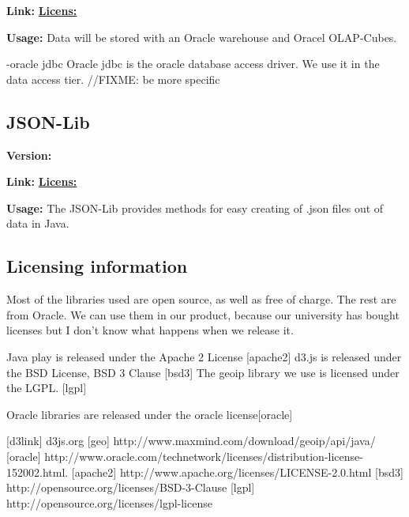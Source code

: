 \textbf{Link:} \href{}

\textbf{Licens:}

\textbf{Usage:} 
Data will be stored with an Oracle warehouse and Oracel OLAP-Cubes.

-oracle jdbc
Oracle jdbc is the oracle database access driver. We use it in the data access tier. //FIXME: be more specific

\subsection{JSON-Lib}
\textbf{Version:} 

\textbf{Link:} \href{}

\textbf{Licens:}

\textbf{Usage:} 
The JSON-Lib provides methods for easy creating of .json files out of data in Java.


\subsection{Licensing information}
Most of the libraries used are open source, as well as free of charge.
The rest are from Oracle. We can use them in our product, because our university has bought licenses 
but I don't know what happens when we release it. 

Java play is released under the Apache 2 License [apache2]
d3.js is released under the BSD License, BSD 3 Clause [bsd3]
The geoip library we use is licensed under the LGPL. [lgpl]

Oracle libraries are released under the oracle license[oracle]


[d3link] d3js.org
[geo] http://www.maxmind.com/download/geoip/api/java/
[oracle] http://www.oracle.com/technetwork/licenses/distribution-license-152002.html.
[apache2] http://www.apache.org/licenses/LICENSE-2.0.html
[bsd3]  http://opensource.org/licenses/BSD-3-Clause
[lgpl] http://opensource.org/licenses/lgpl-license
